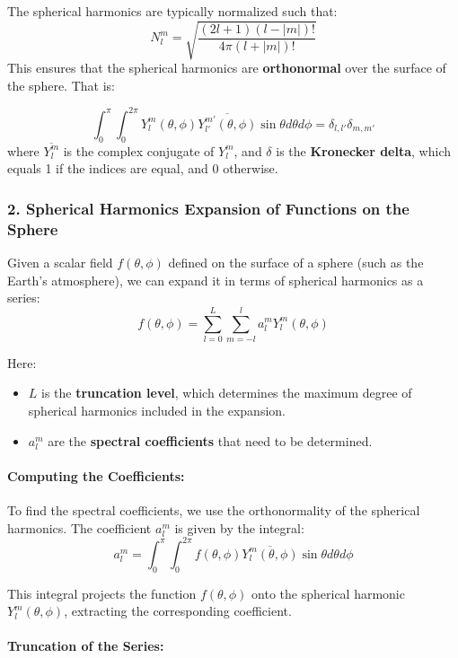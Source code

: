The spherical harmonics are typically normalized such that:
$$N_l^m=\sqrt{\frac{(2l+1)(l-|m|)!}{4\pi(l+|m|)!}}$$
This ensures that the spherical harmonics are \textbf{orthonormal} over the surface of the sphere. That is:

$$\int_0^{\pi}\int_0^{2\pi}Y_l^m(\theta, \phi)\overline{Y_{l'}^{m'}(\theta,\phi)}\sin\theta d\theta d\phi=\delta_{l,l'}\delta_{m,m'}$$ where $\overline{Y_l^m}$
is the complex conjugate of $Y_l^m$, and $\delta$ is the \textbf{Kronecker delta}, which equals 1 if the indices are equal, and 0 otherwise.

\subsubsection{2. \textbf{Spherical Harmonics Expansion of Functions on the Sphere}}

Given a scalar field $f(\theta,\phi)$ defined on the surface of a sphere (such as the Earth's atmosphere), we can expand it in terms of spherical harmonics as a series:
$$f(\theta,\phi)=\displaystyle\sum_{l=0}^L\displaystyle\sum_{m=-l}^{l}a_l^mY_l^m(\theta,\phi)$$

Here:

\begin{itemize}
    \item $L$ is the \textbf{truncation level}, which determines the maximum degree of spherical harmonics included in the expansion.
    \item $a_l^m$ are the \textbf{spectral coefficients} that need to be determined.
\end{itemize}

\paragraph{\textbf{Computing the Coefficients}:}

To find the spectral coefficients, we use the orthonormality of the spherical harmonics. The coefficient $a_l^m$ is given by the integral:
$$a_l^m=\int_0^\pi\int_0^{2\pi}f(\theta,\phi)\overline{Y_l^m(\theta,\phi)}\sin\theta d\theta d\phi$$

This integral projects the function $f(\theta,\phi)$ onto the spherical harmonic $Y_l^m(\theta,\phi)$, extracting the corresponding coefficient.

\paragraph{\textbf{Truncation of the Series}:}

